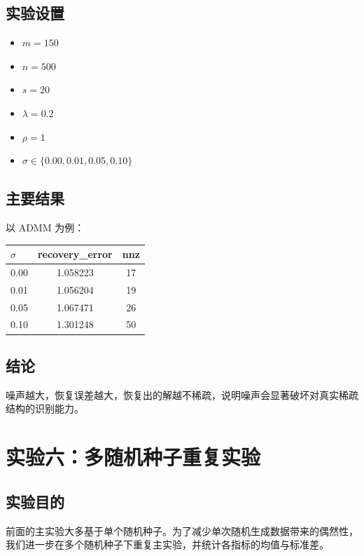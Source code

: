 \documentclass[12pt,a4paper]{ctexart}
\begin{document}
\subsection{实验设置}
\begin{itemize}[leftmargin=2em]
    \item $m=150$
    \item $n=500$
    \item $s=20$
    \item $\lambda=0.2$
    \item $\rho=1$
    \item $\sigma \in \{0.00, 0.01, 0.05, 0.10\}$
\end{itemize}

\subsection{主要结果}
以 ADMM 为例：
\begin{center}
\begin{tabular}{lcc}
\toprule
$\sigma$ & recovery\_error & nnz \\
\midrule
0.00 & 1.058223 & 17 \\
0.01 & 1.056204 & 19 \\
0.05 & 1.067471 & 26 \\
0.10 & 1.301248 & 50 \\
\bottomrule
\end{tabular}
\end{center}

\subsection{结论}
噪声越大，恢复误差越大，恢复出的解越不稀疏，说明噪声会显著破坏对真实稀疏结构的识别能力。

\section{实验六：多随机种子重复实验}
\subsection{实验目的}
前面的主实验大多基于单个随机种子。为了减少单次随机生成数据带来的偶然性，我们进一步在多个随机种子下重复主实验，并统计各指标的均值与标准差。
\end{document}
